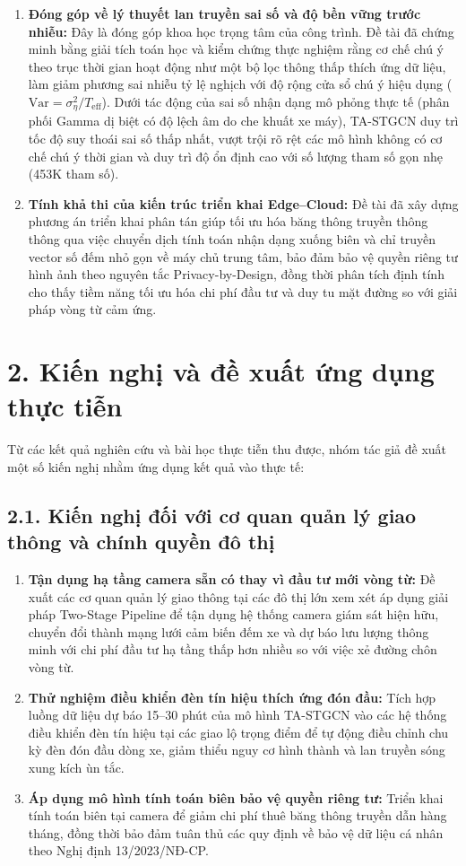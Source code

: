 \begin{enumerate}
    \item \textbf{Đóng góp về lý thuyết lan truyền sai số và độ bền vững trước nhiễu:} 
    Đây là đóng góp khoa học trọng tâm của công trình. Đề tài đã chứng minh bằng giải tích toán học và kiểm chứng thực nghiệm rằng cơ chế chú ý theo trục thời gian hoạt động như một bộ lọc thông thấp thích ứng dữ liệu, làm giảm phương sai nhiễu tỷ lệ nghịch với độ rộng cửa sổ chú ý hiệu dụng ($\text{Var} = \sigma_\eta^2 / T_{\text{eff}}$). Dưới tác động của sai số nhận dạng mô phỏng thực tế (phân phối Gamma dị biệt có độ lệch âm do che khuất xe máy), TA-STGCN duy trì tốc độ suy thoái sai số thấp nhất, vượt trội rõ rệt các mô hình không có cơ chế chú ý thời gian và duy trì độ ổn định cao với số lượng tham số gọn nhẹ (453K tham số).

    \item \textbf{Tính khả thi của kiến trúc triển khai Edge--Cloud:} 
    Đề tài đã xây dựng phương án triển khai phân tán giúp tối ưu hóa băng thông truyền thông thông qua việc chuyển dịch tính toán nhận dạng xuống biên và chỉ truyền vector số đếm nhỏ gọn về máy chủ trung tâm, bảo đảm bảo vệ quyền riêng tư hình ảnh theo nguyên tắc Privacy-by-Design, đồng thời phân tích định tính cho thấy tiềm năng tối ưu hóa chi phí đầu tư và duy tu mặt đường so với giải pháp vòng từ cảm ứng.
\end{enumerate}

\section*{2. Kiến nghị và đề xuất ứng dụng thực tiễn}
Từ các kết quả nghiên cứu và bài học thực tiễn thu được, nhóm tác giả đề xuất một số kiến nghị nhằm ứng dụng kết quả vào thực tế:

\subsection*{2.1. Kiến nghị đối với cơ quan quản lý giao thông và chính quyền đô thị}
\begin{enumerate}
    \item \textbf{Tận dụng hạ tầng camera sẵn có thay vì đầu tư mới vòng từ:} 
    Đề xuất các cơ quan quản lý giao thông tại các đô thị lớn xem xét áp dụng giải pháp Two-Stage Pipeline để tận dụng hệ thống camera giám sát hiện hữu, chuyển đổi thành mạng lưới cảm biến đếm xe và dự báo lưu lượng thông minh với chi phí đầu tư hạ tầng thấp hơn nhiều so với việc xẻ đường chôn vòng từ.
    \item \textbf{Thử nghiệm điều khiển đèn tín hiệu thích ứng đón đầu:} 
    Tích hợp luồng dữ liệu dự báo 15--30 phút của mô hình TA-STGCN vào các hệ thống điều khiển đèn tín hiệu tại các giao lộ trọng điểm để tự động điều chỉnh chu kỳ đèn đón đầu dòng xe, giảm thiểu nguy cơ hình thành và lan truyền sóng xung kích ùn tắc.
    \item \textbf{Áp dụng mô hình tính toán biên bảo vệ quyền riêng tư:} 
    Triển khai tính toán biên tại camera để giảm chi phí thuê băng thông truyền dẫn hàng tháng, đồng thời bảo đảm tuân thủ các quy định về bảo vệ dữ liệu cá nhân theo Nghị định 13/2023/NĐ-CP.
\end{enumerate}


